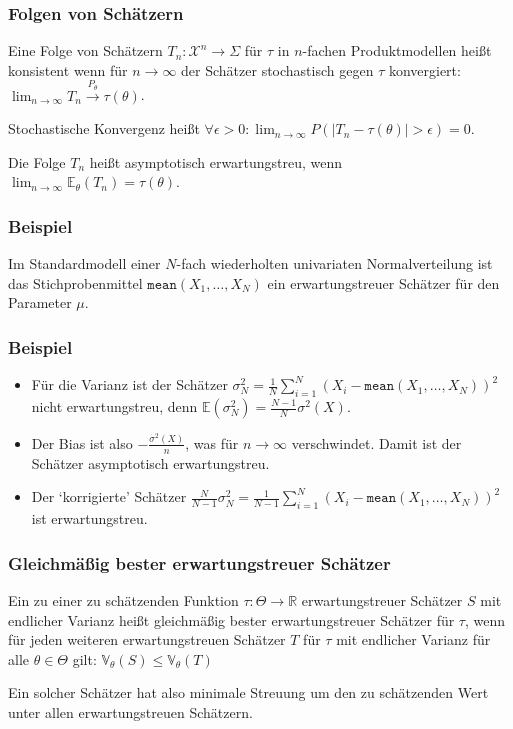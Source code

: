       \begin{frame}
\frametitle{Folgen von Schätzern}
\begin{definition}
Eine Folge von Schätzern $T_n \colon \mathcal{X}^n \to \Sigma$ für $\tau$ in $n$-fachen Produktmodellen heißt \alert{konsistent} wenn für $n\to\infty$
der Schätzer stochastisch gegen $\tau$ konvergiert: $\lim_{n\to\infty} T_n \xrightarrow{P_\theta} \tau(\theta)$.

Stochastische Konvergenz heißt $\forall \epsilon > 0 : \lim_{n\to\infty} P(|T_n - \tau(\theta)| > \epsilon) = 0$.
\end{definition}

\begin{definition}
Die Folge $T_n$ heißt \alert{asymptotisch erwartungstreu}, wenn $\lim_{n\to\infty} \mathbb{E}_{\theta}(T_n) = \tau(\theta)$.
\end{definition}
  \end{frame}


      \begin{frame}
    \frametitle{Beispiel}
Im Standardmodell einer $N$-fach wiederholten univariaten Normalverteilung ist das Stichprobenmittel $\texttt{mean}(X_1,\dots,X_N)$ ein erwartungstreuer Schätzer für den Parameter $\mu$.
  \end{frame}


      \begin{frame}
        \frametitle{Beispiel}
        \begin{itemize}
\item    Für die Varianz ist der Schätzer $\sigma_N^2 = \frac{1}{N} \sum_{i=1}^N (X_i - \texttt{mean}(X_1,\dots,X_N))^2$ nicht erwartungstreu, denn $\mathbb{E}(\sigma_N^2) = \frac{N-1}{N}\sigma^2(X)$.
\item   Der Bias ist also $-\frac{\sigma^2(X)}{n}$, was für $n\to\infty$ verschwindet. Damit ist der Schätzer asymptotisch erwartungstreu.
\item Der `korrigierte' Schätzer $\frac{N}{N-1} \sigma_N^2 = \frac{1}{N-1} \sum_{i=1}^N (X_i - \texttt{mean}(X_1,\dots,X_N))^2$ ist erwartungstreu.
\end{itemize}
\end{frame}


      \begin{frame}
    \frametitle{Gleichmäßig bester erwartungstreuer Schätzer}
\begin{definition}
Ein zu einer zu schätzenden Funktion $\tau \colon \Theta \to \mathbb{R}$ erwartungstreuer Schätzer $S$ mit endlicher Varianz heißt \alert{gleichmäßig bester erwartungstreuer Schätzer} für $\tau$, wenn für jeden weiteren erwartungstreuen Schätzer $T$ für $\tau$ mit endlicher Varianz für alle $\theta \in \Theta$ gilt:
$\mathbb{V}_\theta(S) \leq \mathbb{V}_\theta(T)$
\end{definition}

Ein solcher Schätzer hat also minimale Streuung um den zu schätzenden Wert unter allen erwartungstreuen Schätzern.
  \end{frame}


